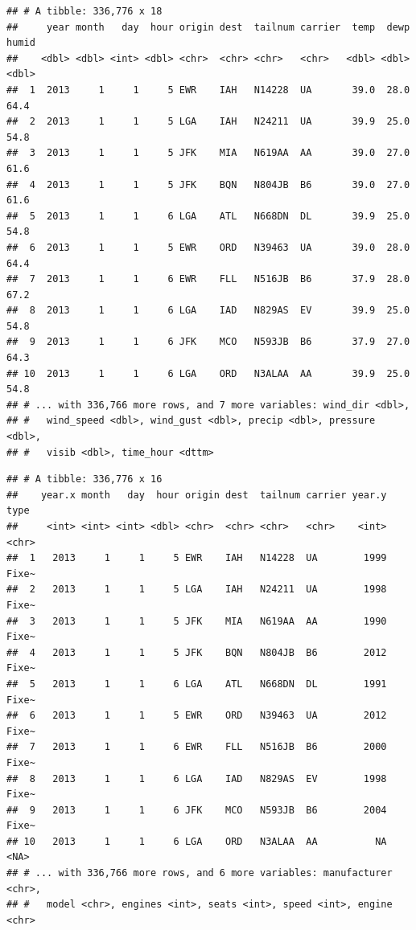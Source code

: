 \documentclass[]{book}
\newenvironment{Shaded}{\begin{snugshade}}{\end{snugshade}}
\newcommand{\CommentTok}[1]{\textcolor[rgb]{0.56,0.35,0.01}{\textit{#1}}}
\newcommand{\DataTypeTok}[1]{\textcolor[rgb]{0.13,0.29,0.53}{#1}}
\newcommand{\KeywordTok}[1]{\textcolor[rgb]{0.13,0.29,0.53}{\textbf{#1}}}
\newcommand{\NormalTok}[1]{#1}
\newcommand{\OperatorTok}[1]{\textcolor[rgb]{0.81,0.36,0.00}{\textbf{#1}}}
\newcommand{\StringTok}[1]{\textcolor[rgb]{0.31,0.60,0.02}{#1}}
\theoremstyle{definition}
\theoremstyle{definition}
\theoremstyle{definition}
\theoremstyle{remark}
\begin{document}
\begin{Shaded}
\end{Shaded}

\begin{verbatim}
## # A tibble: 336,776 x 18
##     year month   day  hour origin dest  tailnum carrier  temp  dewp humid
##    <dbl> <dbl> <int> <dbl> <chr>  <chr> <chr>   <chr>   <dbl> <dbl> <dbl>
##  1  2013     1     1     5 EWR    IAH   N14228  UA       39.0  28.0  64.4
##  2  2013     1     1     5 LGA    IAH   N24211  UA       39.9  25.0  54.8
##  3  2013     1     1     5 JFK    MIA   N619AA  AA       39.0  27.0  61.6
##  4  2013     1     1     5 JFK    BQN   N804JB  B6       39.0  27.0  61.6
##  5  2013     1     1     6 LGA    ATL   N668DN  DL       39.9  25.0  54.8
##  6  2013     1     1     5 EWR    ORD   N39463  UA       39.0  28.0  64.4
##  7  2013     1     1     6 EWR    FLL   N516JB  B6       37.9  28.0  67.2
##  8  2013     1     1     6 LGA    IAD   N829AS  EV       39.9  25.0  54.8
##  9  2013     1     1     6 JFK    MCO   N593JB  B6       37.9  27.0  64.3
## 10  2013     1     1     6 LGA    ORD   N3ALAA  AA       39.9  25.0  54.8
## # ... with 336,766 more rows, and 7 more variables: wind_dir <dbl>,
## #   wind_speed <dbl>, wind_gust <dbl>, precip <dbl>, pressure <dbl>,
## #   visib <dbl>, time_hour <dttm>
\end{verbatim}

\begin{Shaded}
\end{Shaded}

\begin{verbatim}
## # A tibble: 336,776 x 16
##    year.x month   day  hour origin dest  tailnum carrier year.y type 
##     <int> <int> <int> <dbl> <chr>  <chr> <chr>   <chr>    <int> <chr>
##  1   2013     1     1     5 EWR    IAH   N14228  UA        1999 Fixe~
##  2   2013     1     1     5 LGA    IAH   N24211  UA        1998 Fixe~
##  3   2013     1     1     5 JFK    MIA   N619AA  AA        1990 Fixe~
##  4   2013     1     1     5 JFK    BQN   N804JB  B6        2012 Fixe~
##  5   2013     1     1     6 LGA    ATL   N668DN  DL        1991 Fixe~
##  6   2013     1     1     5 EWR    ORD   N39463  UA        2012 Fixe~
##  7   2013     1     1     6 EWR    FLL   N516JB  B6        2000 Fixe~
##  8   2013     1     1     6 LGA    IAD   N829AS  EV        1998 Fixe~
##  9   2013     1     1     6 JFK    MCO   N593JB  B6        2004 Fixe~
## 10   2013     1     1     6 LGA    ORD   N3ALAA  AA          NA <NA> 
## # ... with 336,766 more rows, and 6 more variables: manufacturer <chr>,
## #   model <chr>, engines <int>, seats <int>, speed <int>, engine <chr>
\end{verbatim}
\end{document}
